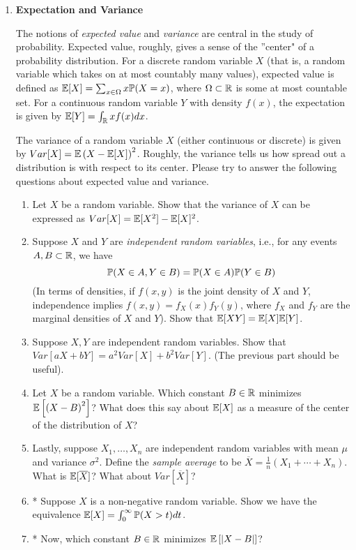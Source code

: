 

\noindent
\begin{enumerate}[leftmargin=\parindent, itemsep=3ex]

    \item{\bf Expectation and Variance}

    The notions of \textit{expected value} and \textit{variance} are central in the study of probability. Expected value, roughly, gives a sense of the ''center" of a probability distribution. For a discrete random variable $X$ (that is, a random variable which takes on at most countably many values), expected value is defined as $\E[X] = \sum_{x \in \Omega}x\P(X = x)$, where $\Omega \subset \R$ is some at most countable set. For a continuous random variable $Y$ with density $f(x)$, the expectation is given by $\E[Y] = \int_{\R}xf(x)dx$.

    The variance of a random variable $X$ (either continuous or discrete) is given by $Var[X] = \E\left(X - \E[X]\right)^2$. Roughly, the variance tells us how spread out a distribution is with respect to its center. Please try to answer the following questions about expected value and variance.

    \begin{enumerate}
        \item Let $X$ be a random variable. Show that the variance of $X$ can be expressed as $Var[X] = \E[X^2] - \E[X]^2$.
        \item Suppose $X$ and $Y$ are \textit{independent random variables}, i.e., for any events $A, B \subset \R$, we have $$\P(X \in A, Y\in B) = \P(X \in A)\P(Y \in B)$$ (In terms of densities, if $f(x, y)$ is the joint density of $X$ and $Y$, independence implies $f(x, y) = f_X(x)f_Y(y)$, where $f_X$ and $f_Y$ are the marginal densities of $X$ and $Y$). Show that $\E[XY] = \E[X]\E[Y]$.
        \item Suppose $X, Y$ are independent random variables. Show that $Var[aX + bY] = a^2Var[X] + b^2Var[Y]$. (The previous part should be useful).
        \item Let $X$ be a random variable. Which constant $B \in \R$ minimizes $\E\left[\left(X - B\right)^2\right]$? What does this say about $\E[X]$ as a measure of the center of the distribution of $X$?
        \item Lastly, suppose $X_1, \dots, X_n$ are independent random variables with mean $\mu$ and variance $\sigma^2$. Define the \textit{sample average} to be $\overline{X} = \frac{1}{n}(X_1 + \cdots + X_n)$. What is $\E[\overline{X}]$? What about $Var[\overline{X}]$?
        \item * Suppose $X$ is a non-negative random variable. Show we have the equivalence $\E[X] = \int_0^\infty \P(X > t)dt$.
        \item * Now, which constant $B \in \R$ minimizes $\E\left[|X - B|\right]$?
    \end{enumerate}


\end{enumerate}
